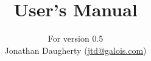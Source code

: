\documentclass[11pt, letterpaper, oneside, titlepage]{article}
\begin{document}
\vsize 9.0in



\title{ User's Manual}
\author{
  For  version 0.5\\
  Jonathan Daugherty (\href{mailto:jtd@galois.com}{jtd@galois.com})
}
\maketitle

\tableofcontents
\newpage








\end{document}
